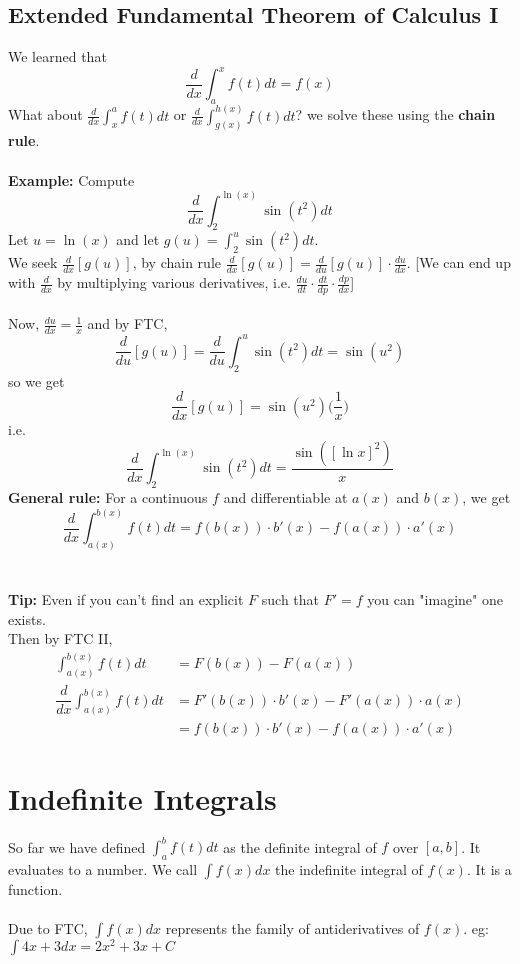 \documentclass[11pt, a4paper]{memoir}
\theoremstyle{change}
\theoremstyle{plain}
\theoremstyle{nonumberplain}
\numberwithin{equation}{section}
\begin{document}
\subsection{Extended Fundamental Theorem of Calculus I}
We learned that $$\dfrac{d}{dx}\int^x_a f(t) dt = f(x)$$
What about $\frac{d}{dx} \int^a_x f(t) dt$ or $\frac{d}{dx} \int^{h(x)}_{g(x)} f(t) dt$? we solve these using the \textbf{chain rule}. \\ \; \\
\textbf{Example:} Compute $$\dfrac{d}{dx}\int^{\ln(x)}_{2} \sin(t^2) dt$$
Let $u = \ln(x)$ and let $g(u) = \int^u_2 \sin(t^2) dt$. \\
We seek $\frac{d}{dx}[g(u)]$, by chain rule $\frac{d}{dx}[g(u)] = \frac{d}{du}[g(u)] \cdot \frac{du}{dx}$. [We can end up with $\frac{d}{dx}$ by multiplying various derivatives, i.e. $\frac{du}{dt} \cdot \frac{dt}{dp} \cdot \frac{dp}{dx}$]\\ \: \\
Now, $\frac{du}{dx} = \frac{1}{x}$ and by FTC, $$\frac{d}{du}[g(u)] = \frac{d}{du} \int^u_2 \sin(t^2) dt = \sin(u^2)$$
so we get $$\frac{d}{dx}[g(u)] = \sin(u^2)\bigg(\frac{1}{x}\bigg)$$
i.e. $$\frac{d}{dx}\int^{\ln(x)}_{2} \sin(t^2) dt = \dfrac{\sin([\ln x]^2)}{x}$$ 
\textbf{General rule:} For a continuous $f$ and differentiable at $a(x)$ and $b(x)$, we get $$\dfrac{d}{dx} \int^{b(x)}_{a(x)} f(t) dt = f(b(x)) \cdot b'(x) - f(a(x)) \cdot a'(x)$$\\ \: \\
\textbf{Tip:}  Even if you can't find an explicit $F$ such that $F' = f$ you can "imagine" one exists. \\
Then by FTC II,
\begin{align*}
  \int^{b(x)}_{a(x)} f(t) dt &= F(b(x)) - F(a(x)) \\
  \dfrac{d}{dx} \int^{b(x)}_{a(x)} f(t) dt &= F'(b(x)) \cdot b'(x) - F'(a(x)) \cdot a(x)\\
  &= f(b(x)) \cdot b'(x) - f(a(x)) \cdot a'(x)
\end{align*}
\section{Indefinite Integrals}
So far we have defined $\int^b_a f(t) dt$ as the definite integral of $f$ over $[a, b]$. It evaluates to a number.
We call $\int f(x) dx$ the indefinite integral of $f(x)$. It is a function.
\\ \vspace{0.5ex} \\
Due to FTC, $\int f(x) dx$ represents the family of antiderivatives of $f(x)$. eg: $\int 4x + 3 dx = 2x^2 + 3x + C$
\end{document}
